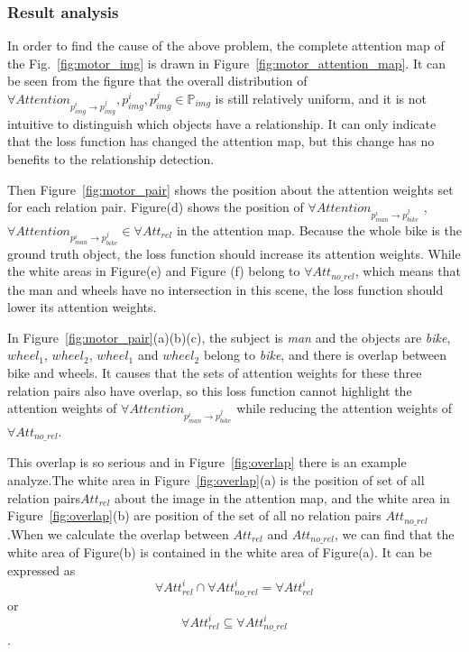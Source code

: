 \subsubsection{Result analysis}

In order to find the cause of the above problem, the complete attention map of the Fig.~\ref{fig:motor_img} is drawn in Figure~\ref{fig:motor_attention_map}. It can be seen from the figure that the overall distribution of $ \forall Attention_{p^i_{img} \to p^j_{img}} , p^i_{img},p^j_{img} \in \mathbb{P}_{img} $ is still relatively uniform, and it is not intuitive to distinguish which objects have a relationship. It can only indicate that the loss function has changed the attention map, but this change has no benefits to the relationship detection.

Then Figure~\ref{fig:motor_pair}  shows the position about the attention weights set for each relation pair. Figure(d) shows the position of $ \forall Attention_{p^i_{man} \to p^j_{bike}} $ ,  $ \forall Attention_{p^i_{man} \to p^j_{bike}} \in \forall Att_{rel} $ in the attention map. Because the whole bike is the ground truth object, the loss function should increase its attention weights. While the white areas in Figure(e) and Figure (f) belong to $ \forall Att_{no\_rel} $, which means that the man and wheels have no intersection in this scene, the loss function should lower its attention weights.

 In Figure~\ref{fig:motor_pair}(a)(b)(c), the subject is \textit{man} and the objects are \textit{bike}, \textit{$ wheel_1 $}, \textit{$ wheel_2 $}, \textit{$ wheel_1 $} and \textit{$ wheel_2 $} belong to \textit{bike}, and there is overlap between bike and wheels. It causes that the sets of attention weights for these three relation pairs also have overlap, so this loss function cannot highlight the attention weights of $ \forall Attention_{p^i_{man} \to p^j_{bike}} $ while reducing the attention weights of  $ \forall Att_{no\_rel} $.

This overlap is so serious and in Figure~\ref{fig:overlap} there is an example analyze.The white area in Figure~\ref{fig:overlap}(a) is the position of set of all relation pairs$ Att_{rel} $  about the image in the attention map, and the white area in Figure~\ref{fig:overlap}(b)  are position of the set of all no relation pairs $ Att_{no\_rel} $.When we calculate the overlap between $Att_{rel} $ and  $Att_{no\_rel} $, we can find that the white area of Figure(b) is contained in the white area of Figure(a). It can be expressed as  $$ \forall Att^i_{rel} \cap  \forall Att^i_{no\_rel } = \forall Att^i_{rel}  $$ or $$ \forall Att^i_{rel}  \subseteq  \forall Att^i_{no\_rel }$$.

